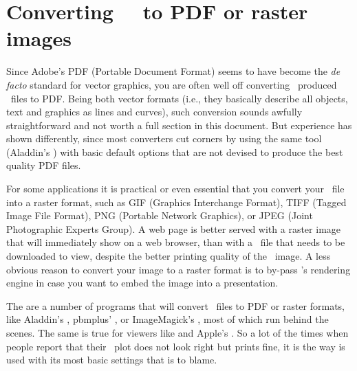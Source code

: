 \section{Converting \gmt\ \PS\ to PDF or raster images}

Since Adobe's PDF (Portable Document Format) seems to have become the \emph{de facto} standard for vector graphics, you are often well off converting \GMT\ produced \PS\ files to PDF. Being both vector formats (i.e., they basically describe all objects, text and graphics as lines and curves), such conversion sounds awfully straightforward and not worth a full section in this document. But experience has shown differently, since most converters cut corners by using the same tool (Aladdin's ) with basic default options that are not devised to produce the best quality PDF files.

For some applications it is practical or even essential that you convert your \PS\ file into a raster format, such as GIF (Graphics Interchange Format), TIFF (Tagged Image File Format), PNG (Portable Network Graphics), or JPEG (Joint Photographic Experts Group). A web page is better served with a raster image that will immediately show on a web browser, than with a \PS\ file that needs to be downloaded to view, despite the better printing quality of the \PS\ image. A less obvious reason to convert your image to a raster format is to by-pass 's rendering engine in case you want to embed the image into a presentation.

The are a number of programs that will convert \PS\ files to PDF or raster formats, like Aladdin's , pbmplus' , or ImageMagick's , most of which run  behind the scenes. The same is true for viewers like  and Apple's . So a lot of the times when people report that their \PS\ plot does not look right but prints fine, it is the way  is used with its most basic settings that is to blame.


